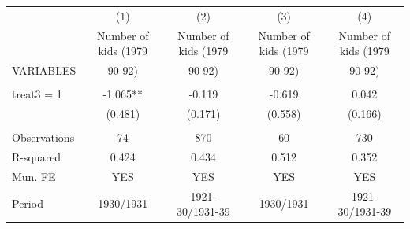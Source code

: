 \begin{tabular}{lcccc} \hline
 & (1) & (2) & (3) & (4) \\
 & Number of kids (1979 & Number of kids (1979 & Number of kids (1979 & Number of kids (1979 \\
VARIABLES & 90-92) & 90-92) & 90-92) & 90-92) \\ \hline
 &  &  &  &  \\
treat3 = 1 & -1.065** & -0.119 & -0.619 & 0.042 \\
 & (0.481) & (0.171) & (0.558) & (0.166) \\
 &  &  &  &  \\
Observations & 74 & 870 & 60 & 730 \\
R-squared & 0.424 & 0.434 & 0.512 & 0.352 \\
Mun. FE & YES & YES & YES & YES \\
 Period & 1930/1931 & 1921-30/1931-39 & 1930/1931 & 1921-30/1931-39 \\ \hline
\end{tabular}
